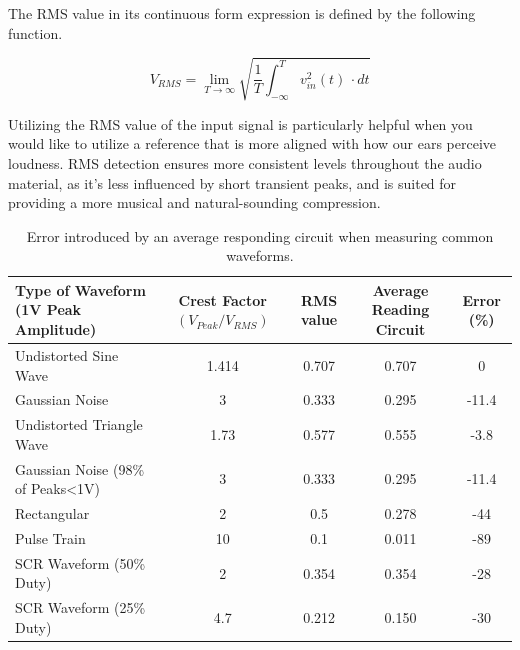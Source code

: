 \documentclass[10pt]{article}
\begin{document}
\begin{multicols*}{2}
                    The RMS value in its continuous form expression is defined by the following function. \cite{aes-that-rms}
                    
                        \begin{equation}
                            V_{RMS} = \lim_{T \to \infty}\sqrt{\frac{1}{T}\int_{-\infty}^{T} v_{in}^2(t) \,\cdot dt}
                        \end{equation}
                    
                    Utilizing the RMS value of the input signal is particularly helpful when you would like to utilize a reference that is more aligned with how our ears perceive loudness. RMS detection ensures more consistent levels throughout the audio material, as it's less influenced by short transient peaks, and is suited for providing a more musical and natural-sounding compression.

                        \begin{table}[!th]
                            \centering
                            \begin{tabularx}{\textwidth}{|l*{4}{|C}|}
                                \hline
                                Type of Waveform (1V Peak Amplitude) & Crest Factor $(V_{Peak}/V_{RMS})$ & RMS value & Average Reading Circuit & Error (\%) \\ \hline
                                Undistorted Sine Wave & 1.414 & 0.707 & 0.707 & 0 \\    \hline
                                Gaussian Noise & 3 & 0.333 & 0.295 & -11.4 \\   \hline
                                Undistorted Triangle Wave & 1.73 & 0.577 & 0.555 & -3.8 \\   \hline
                                Gaussian Noise (98\% of Peaks<1V) & 3 & 0.333 & 0.295 & -11.4 \\    \hline
                                Rectangular & 2 & 0.5 & 0.278 & -44 \\    \hline
                                Pulse Train & 10 & 0.1 & 0.011 & -89 \\    \hline
                                SCR Waveform (50\% Duty) & 2 & 0.354 & 0.354 & -28 \\    \hline
                                SCR Waveform (25\% Duty) & 4.7 & 0.212 & 0.150 & -30 \\    \hline
                            \end{tabularx}
                            \caption{Error introduced by an average responding circuit when measuring common waveforms.}
                            \label{table:ave-err}
                        \end{table}


\end{multicols*}
\end{document}
